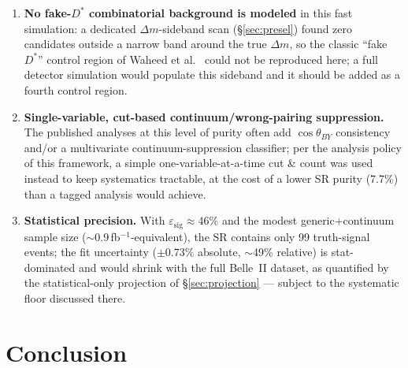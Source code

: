 \documentclass[11pt]{article}
\begin{document}
\begin{enumerate}
  ultimate precision of the measurement, flattening around a $\sim$3\%
  floor rather than continuing to shrink as $1/\sqrt{L}$.
\item \textbf{No fake-$D^{*}$ combinatorial background is modeled} in
  this fast simulation: a dedicated $\Delta m$-sideband scan
  (\S\ref{sec:presel}) found zero candidates outside a narrow band around
  the true $\Delta m$, so the classic ``fake $D^{*}$'' control region of
  Waheed et al.~\cite{Waheed:2019} could not be reproduced here; a full
  detector simulation
  would populate this sideband and it should be added as a fourth control
  region.
\item \textbf{Single-variable, cut-based continuum/wrong-pairing
  suppression.} The published analyses at this level of purity often add
  $\cos\theta_{BY}$ consistency and/or a multivariate
  continuum-suppression classifier; per the analysis policy of this
  framework, a simple one-variable-at-a-time cut \& count was used
  instead to keep systematics tractable, at the cost of a lower SR purity
  (7.7\%) than a tagged analysis would achieve.
\item \textbf{Statistical precision.} With
  $\varepsilon_{\mathrm{sig}} \approx 46\%$ and the modest
  generic+continuum sample size ($\sim$0.9\,fb$^{-1}$-equivalent), the SR
  contains only 99 truth-signal events; the fit uncertainty ($\pm 0.73\%$
  absolute, $\sim$49\% relative) is stat-dominated and would shrink with
  the full Belle~II dataset, as quantified by the statistical-only
  projection of \S\ref{sec:projection} --- subject to the systematic
  floor discussed there.
\end{enumerate}

\section{Conclusion}
\end{document}
